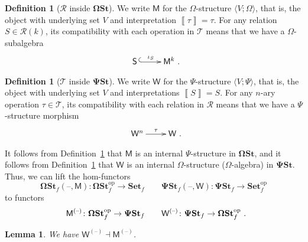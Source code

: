 \documentclass[11pt, a4paper, twoside,leqno]{amsart}
\newcommand{\cat}[1]{\mathbf{#1}}
\newcommand{\thg}{{\mathord{\text{--}}}}
\newcommand{\dbr}[1]{\left\llbracket{#1}\right\rrbracket}
\newcommand{\cd}[2][]{\vcenter{\hbox{\xymatrix#1{#2}}}}
\numberwithin{equation}{section}
\theoremstyle{plain}
\newtheorem{Lemma}[Thm]{Lemma}
\theoremstyle{definition}
\newtheorem{Defn}[Thm]{Definition}
\begin{document}
\begin{Defn}[\(\mathscr{R}
  \) inside $\cat{\Omega St}$]
  \label{def:rel-in-F-str}
  We write $\mathsf{M}$ for the \(\Omega\)-structure \(\langle V;
  \Omega \rangle\), that is, the object with underlying set $V$
  and interpretation $\dbr{\tau} = \tau$. For any relation $S \in \mathscr{R}(k)$, its
  compatibility with each operation in \(\mathscr{T}
  \) means that we have a
  \(\Omega\)-subalgebra
  \begin{equation*}
    \cd{
      {\mathsf{S}\,} \ar@{^{(}->}[r]^-{\iota_{S}}
      & \mathsf{M}^{k} \rlap{ .}
    }
  \end{equation*}
\end{Defn}



\begin{Defn}[\(\mathscr{T}
  \) inside $\cat{\Psi St}$]
  \label{def:ops-in-R-str}
  We write $\mathsf{W}$ for the \(\Psi\)-structure \(\langle V; \Psi
  \rangle\), that is, the object with underlying set $V$
  and interpretations $\dbr{S} = S$. For any \(n\)-ary operation
  \(\tau \in \mathscr{T}
  \), its compatibility with each relation in \(\mathscr{R}\) means that we
  have a
  \(\Psi\)-structure morphism
  \begin{equation*}
    \cd{
      \mathsf{W}^{n} \ar[r]^-{\tau} & \mathsf{W}
      \rlap{ .}}
  \end{equation*}
\end{Defn}

It follows from Definition~\ref{def:rel-in-F-str} that $\mathsf{M}$ is an
internal 
\(\Psi\)-structure in $\cat{\Omega St}$, and it follows from Definition~\ref{def:ops-in-R-str}  that $\mathsf{W}$
is an internal \(\Omega\)-structure (\(\Omega\)-algebra) in $\cat{\Psi St}$. Thus, we can lift the hom-functors
\begin{equation*}
  \cat{\Omega St}_{f}(\thg, \mathsf{M}) \colon \cat{\Omega St}_{f}^\mathrm{op} \rightarrow \cat{Set}_{f} \qquad \cat{\Psi St}_{f}(\thg, \mathsf{W}) \colon \cat{\Psi St}_{f} \rightarrow \cat{Set}_{f}^\mathrm{op}
\end{equation*}
to functors
\begin{equation*}
  \mathsf{M}^{(\thg)} \colon \cat{\Omega St}_{f}^\mathrm{op} \rightarrow
  \cat{\Psi St}_{f} \qquad 
  \mathsf{W}^{(\thg)} \colon \cat{\Psi St}_{f} \rightarrow
  \cat{\Omega St}_{f}^\mathrm{op}\rlap{ .}
\end{equation*}

\begin{Lemma}
  \label{lem:adj-M-W-lifted-homs}
  We have $\mathsf{W}^{(\thg)} \dashv \mathsf{M}^{(\thg)}$.
\end{Lemma}
\end{document}

